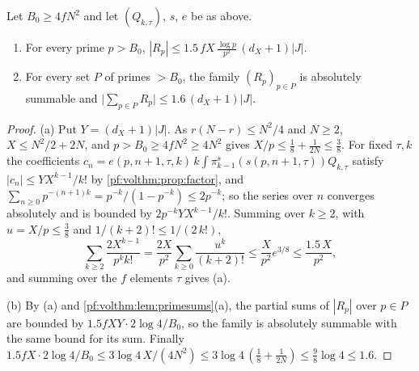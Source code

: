 \begin{lemma}\label{pf:volthm:lem:primemodel}
Let $B_0\ge4fN^2$ and let $(Q_{k,\tau})$, $s$, $e$ be as above.
\begin{enumerate}[label=(\alph*)]
\item For every prime $p>B_0$, $|R_p|\le1.5\,fX\,\frac{\log p}{p^2}\,(d_X+1)|J|$.
\item For every set $P$ of primes $>B_0$, the family $(R_p)_{p\in P}$ is absolutely summable and
$\bigl|\sum_{p\in P}R_p\bigr|\le1.6\,(d_X+1)|J|$.
\end{enumerate}
\end{lemma}

\begin{proof}
(a) Put $Y=(d_X+1)|J|$. As $r(N-r)\le N^2/4$ and $N\ge2$, $X\le N^2/2+2N$, and $p>B_0\ge4fN^2\ge4N^2$ gives
$X/p\le\frac18+\frac1{2N}\le\frac38$. For fixed $\tau,k$ the coefficients $c_n=e(p,n+1,\tau,k)\,k\int\pi^s_{k-1}(s(p,n+1,\tau))
Q_{k,\tau}$ satisfy $|c_n|\le YX^{k-1}/k!$ by \cref{pf:volthm:prop:factor}, and $\sum_{n\ge0}p^{-(n+1)k}=
p^{-k}/(1-p^{-k})\le2p^{-k}$; so the series over $n$ converges absolutely and is bounded by $2p^{-k}YX^{k-1}/k!$. Summing
over $k\ge2$, with $u=X/p\le\frac38$ and $1/(k+2)!\le1/(2\,k!)$,
\[
\sum_{k\ge2}\frac{2X^{k-1}}{p^kk!}=\frac{2X}{p^2}\sum_{k\ge0}\frac{u^k}{(k+2)!}\le\frac{X}{p^2}e^{3/8}\le
\frac{1.5\,X}{p^2},
\]
and summing over the $f$ elements $\tau$ gives (a).

(b) By (a) and \cref{pf:volthm:lem:primesums}(a), the partial sums of $|R_p|$ over $p\in P$ are bounded by
$1.5fXY\cdot2\log4/B_0$, so the family is absolutely summable with the same bound for its sum. Finally
$1.5fX\cdot2\log4/B_0\le3\log4\,X/(4N^2)\le3\log4\,(\frac18+\frac1{2N})\le\frac98\log4\le1.6$.
\end{proof}


